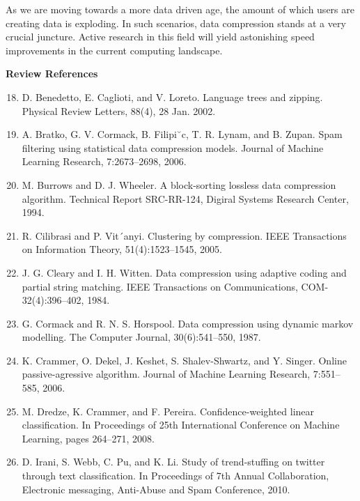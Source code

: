 \documentclass{article}
\begin{document}
As we are moving towards a more data driven age, the amount of which users are creating data is exploding. In such scenarios, data compression stands at a very crucial juncture. Active research in this field will yield astonishing speed improvements in the current computing landscape.

\clearpage





\textbf{Review References}

\begin{enumerate}
	\setcounter{enumi}{17}
	
	\item D. Benedetto, E. Caglioti, and V. Loreto. Language
	trees and zipping. Physical Review Letters, 88(4), 28
	Jan. 2002.
	
	\item A. Bratko, G. V. Cormack, B. Filipi˘c, T. R. Lynam,
	and B. Zupan. Spam filtering using statistical data
	compression models. Journal of Machine Learning
	Research, 7:2673–2698, 2006.
	
	\item M. Burrows and D. J. Wheeler. A block-sorting
	lossless data compression algorithm. Technical Report
	SRC-RR-124, Digiral Systems Research Center, 1994.
	
	\item R. Cilibrasi and P. Vit´anyi. Clustering by
	compression. IEEE Transactions on Information
	Theory, 51(4):1523–1545, 2005.
	
	\item J. G. Cleary and I. H. Witten. Data compression using
	adaptive coding and partial string matching. IEEE
	Transactions on Communications,
	COM-32(4):396–402, 1984.
	
	\item G. Cormack and R. N. S. Horspool. Data compression
	using dynamic markov modelling. The Computer
	Journal, 30(6):541–550, 1987.
	
	\item K. Crammer, O. Dekel, J. Keshet, S. Shalev-Shwartz,
	and Y. Singer. Online passive-agressive algorithm.
	Journal of Machine Learning Research, 7:551–585,
	2006.

	\item M. Dredze, K. Crammer, and F. Pereira.
	Confidence-weighted linear classification. In
	Proceedings of 25th International Conference on
	Machine Learning, pages 264–271, 2008.

	\item D. Irani, S. Webb, C. Pu, and K. Li. Study of
	trend-stuffing on twitter through text classification. In
	Proceedings of 7th Annual Collaboration, Electronic
	messaging, Anti-Abuse and Spam Conference, 2010.


\end{enumerate}
\end{document}
